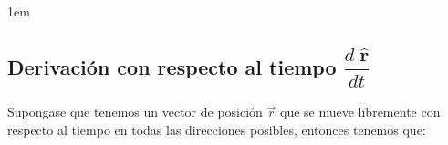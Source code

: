 \documentclass[12pt, fleqn]{report}                             %
\newenvironment{SmallIndentation}[1][0.75em]                    %
    {\begin{adjustwidth}{#1}{}\begin{footnotesize}}                 %
    {\end{footnotesize}\end{adjustwidth}}                           %
\newcommand{\uVec}[1]{\boldsymbol{\hat{\textbf{$#1$}}}}         %
\newcommand \Derivate[2]                                        %
        {\dfrac{d \; #1}{d #2}}                                     %
\newcommand \Partial[2]                                        %
        {\dfrac{\partial \; #1}{\partial #2}}                      %
\begin{document}
\begin{itemize}
\begin{SmallIndentation}[1em]
                        \end{SmallIndentation}
                        



                \end{itemize}



            \clearpage
            \subsection{Derivación con respecto al tiempo $\Derivate{\uVec{r}}{t}$}

                Supongase que tenemos un vector de posición $\vec{r}$ que se mueve libremente con respecto
                al tiempo en todas las direcciones posibles, entonces tenemos que:
                
\end{document}
